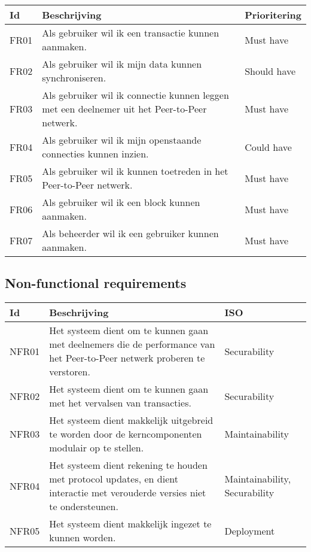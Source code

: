 \begin{tabular}{|p{1.1cm}|p{8cm}|p{3cm}|}
  \hline
  \textbf{Id} & \textbf{Beschrijving} & \textbf{Prioritering} \\
  \hline
  FR01 & Als gebruiker wil ik een transactie kunnen aanmaken. & Must have \\
  \hline
  FR02 & Als gebruiker wil ik mijn data kunnen synchroniseren. & Should have \\
  \hline
  FR03 & Als gebruiker wil ik connectie kunnen leggen met een deelnemer uit het Peer-to-Peer netwerk. & Must have \\
  \hline
  FR04 & Als gebruiker wil ik mijn openstaande connecties kunnen inzien. & Could have \\
  \hline
  FR05 & Als gebruiker wil ik kunnen toetreden in het Peer-to-Peer netwerk. & Must have \\
  \hline
  FR06 & Als gebruiker wil ik een block kunnen aanmaken. & Must have \\
  \hline
  FR07 & Als beheerder wil ik een gebruiker kunnen aanmaken. & Must have \\
  \hline
\end{tabular}

\subsection{Non-functional requirements}

\begin{tabular}{|p{1.1cm}|p{8cm}|p{3cm}|}
  \hline
  \textbf{Id} & \textbf{Beschrijving} & \textbf{ISO} \\
  \hline
  NFR01 & Het systeem dient om te kunnen gaan met deelnemers die de performance van het Peer-to-Peer netwerk proberen te verstoren. & Securability \\
  \hline  
  NFR02 & Het systeem dient om te kunnen gaan met het vervalsen van transacties. & Securability \\
  \hline
  NFR03 & Het systeem dient makkelijk uitgebreid te worden door de kerncomponenten modulair op te stellen. & Maintainability \\
  \hline
  NFR04 & Het systeem dient rekening te houden met protocol updates, en dient interactie met verouderde versies niet te ondersteunen. & Maintainability, Securability \\ 
  \hline
  NFR05 & Het systeem dient makkelijk ingezet te kunnen worden. & Deployment \\
  \hline
\end{tabular}